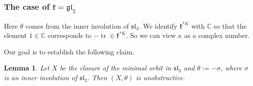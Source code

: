 \documentclass[12pt]{amsart}
\newcommand{\C}{\mathbb{C}}
\newcommand{\kf}{\mathfrak{k}}
\newtheorem{Lem}[Thm]{Lemma}
\theoremstyle{definition}
\numberwithin{equation}{section}
\begin{document}
\subsubsection{The case of $\kf=\mathfrak{gl}_2$}\label{SS_HC_sl3_gl2}
Here $\theta$ comes from the inner involution of $\mathfrak{sl}_3$. We identify $\kf^{*K}$ with $\C$ so that the element $1\in \C$
corresponds to $-\operatorname{tr}\in \kf^{*K}$. So we can view $\kappa$ as a complex number. 

Our goal is to establish the following claim.

\begin{Lem}\label{Lem:sl3_gl2_unobstructive}
Let $X$ be the closure of the minimal orbit in $\mathfrak{sl}_3$ and $\theta:=-\sigma$,
where $\sigma$ is an inner involution of $\mathfrak{sl}_3$. Then $(X,\theta)$ is unobstructive.
\end{Lem}
\end{document}
